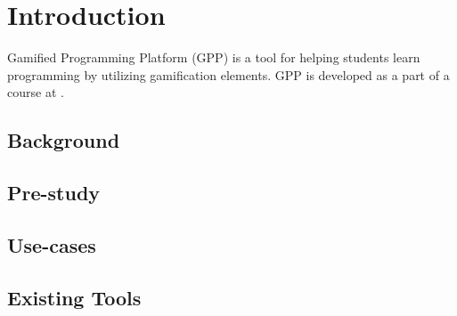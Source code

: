 \chapter{Introduction}
Gamified Programming Platform (GPP) is a tool for helping students learn programming by utilizing gamification elements. GPP is developed as a part of a course at \LTU.

\section{Background}


\section{Pre-study}


\section{Use-cases}


\section{Existing Tools}

